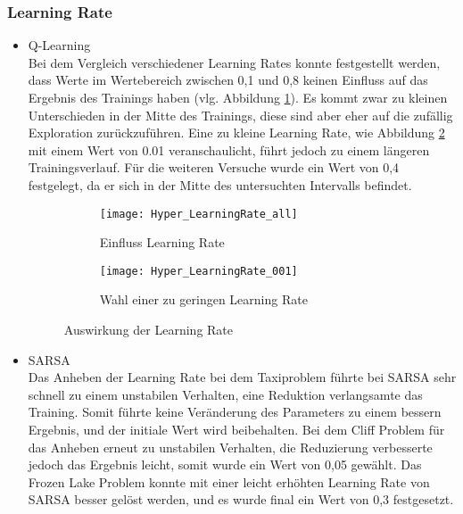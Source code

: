 \subsubsection{Learning Rate}
\begin{itemize}
    \item Q-Learning\\
    Bei dem Vergleich verschiedener Learning Rates konnte festgestellt werden, dass Werte im Wertebereich zwischen 0,1 und 0,8 keinen Einfluss auf das Ergebnis des Trainings haben (vlg. Abbildung \ref{fig:learningRate_all}).
    Es kommt zwar zu kleinen Unterschieden in der Mitte des Trainings, diese sind aber eher auf die zufällig Exploration zurückzuführen.
    Eine zu kleine Learning Rate, wie Abbildung \ref{fig:learningRate_low} mit einem Wert von 0.01 veranschaulicht, führt jedoch zu einem längeren Trainingsverlauf.
    Für die weiteren Versuche wurde ein Wert von 0,4 festgelegt, da er sich in der Mitte des untersuchten Intervalls befindet.

    \begin{figure}[H]
        \centering
        \begin{subfigure}{.5\textwidth}
          \centering
          \texttt{[image: Hyper\_LearningRate\_all]}
          \caption{Einfluss Learning Rate}
          \label{fig:learningRate_all}
        \end{subfigure}%
        \begin{subfigure}{.5\textwidth}
          \centering
          \texttt{[image: Hyper\_LearningRate\_001]}
          \caption{Wahl einer zu geringen Learning Rate}
          \label{fig:learningRate_low}
        \end{subfigure}
        \caption{Auswirkung der Learning Rate}
        \label{fig:learningRate_Q-Learning}
    \end{figure}
    \item SARSA\\
    Das Anheben der Learning Rate bei dem Taxiproblem führte bei SARSA sehr schnell zu einem unstabilen Verhalten, eine Reduktion verlangsamte das Training.
  	Somit führte keine Veränderung des Parameters zu einem bessern Ergebnis, und der initiale Wert wird beibehalten.
    Bei dem Cliff Problem für das Anheben erneut zu unstabilen Verhalten, die Reduzierung verbesserte jedoch das Ergebnis leicht, somit wurde ein Wert von 0,05 gewählt.
    Das Frozen Lake Problem konnte mit einer leicht erhöhten Learning Rate von SARSA besser gelöst werden, und es wurde final ein Wert von 0,3 festgesetzt.
\end{itemize}
